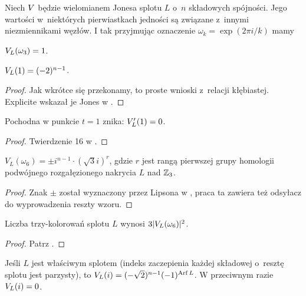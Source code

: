 Niech $V$ będzie wielomianem Jonesa splotu $L$ o~$n$ składowych spójności.
Jego wartości w~niektórych pierwiastkach jedności są związane z~innymi niezmiennikami węzłów.
I tak przyjmując oznaczenie $\omega_k = \exp(2\pi i/k)$ mamy

\begin{proposition}
    \label{prp:jones_at_roots_of_unity}
    $V_L(\omega_3) = 1$.
\end{proposition}

\begin{proposition}
    $V_L(1) = (-2)^{n-1}$.
\end{proposition}

\begin{proof}
    Jak wkrótce się przekonamy, to proste wnioski z~relacji kłębiastej.
    Explicite wskazał je Jones w \cite[twierdzenie 14, 15]{jones85}.
\end{proof}

\begin{proposition}
    Pochodna w punkcie $t = 1$ znika: $V'_L(1) = 0$.
\end{proposition}

\begin{proof}
    Twierdzenie 16 w \cite{jones85}.
\end{proof}

\begin{proposition}
    $V_L(\omega_6) = \pm i^{n-1} \cdot (\sqrt 3i)^r$, gdzie $r$ jest rangą pierwszej grupy homologii podwójnego rozgałęzionego nakrycia $L$ nad $\mathbb Z_3$.
\end{proposition}

\begin{proof}
    Znak $\pm$ został wyznaczony przez Lipsona w \cite{lipson86}, praca ta zawiera też odsyłacz do wyprowadzenia reszty wzoru.
\end{proof}

\begin{proposition}
    Liczba trzy-kolorowań splotu $L$ wynosi $3|V_L(\omega_6)|^2$.
\end{proposition}

\begin{proof}
    Patrz \cite{przytycki98}.
\end{proof}

\begin{proposition}
    Jeśli $L$ jest właściwym splotem (indeks zaczepienia każdej składowej o~resztę splotu jest parzysty), to $V_L(i) = (-\sqrt 2)^{n-1}(-1)^{\operatorname{Arf} L}$.
    W przeciwnym razie $V_L(i) = 0$.
\end{proposition}

